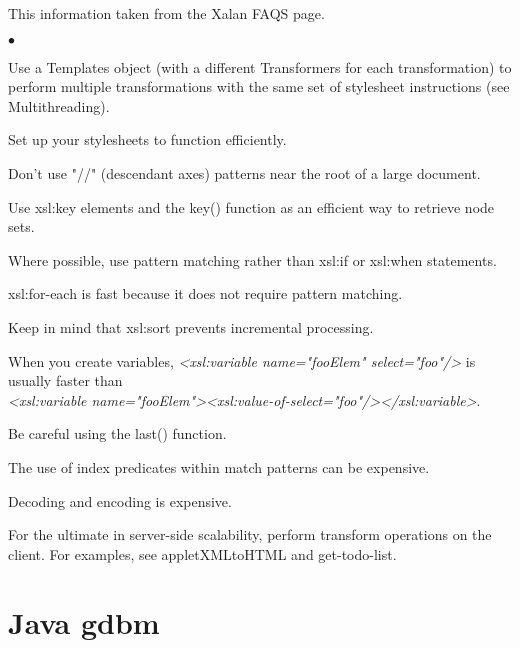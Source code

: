 \documentclass[a4paper,11pt]{article}
\newenvironment{bulletedlist}%
{\begin{list}{$\bullet$}{\setlength{\itemsep}{0pt}\setlength{\parsep}{0pt}}}%
{\end{list}}
\begin{document}
This information taken from the Xalan FAQS page.

\begin{bulletedlist}

\item Use a Templates object (with a different Transformers for each
transformation) to perform multiple transformations with the same set
of stylesheet instructions (see Multithreading).

\item Set up your stylesheets to function efficiently.

\item Don't use "//" (descendant axes) patterns near the root of a
large document.

\item Use xsl:key elements and the key() function as an efficient way
to retrieve node sets.

\item Where possible, use pattern matching rather than xsl:if or
xsl:when statements.

\item xsl:for-each is fast because it does not require pattern matching.

\item Keep in mind that xsl:sort prevents incremental processing.

\item When you create variables,
{\em <xsl:variable name="fooElem" select="foo"/>\/} is usually faster
than \\
{\em <xsl:variable name="fooElem"><xsl:value-of-select="foo"/></xsl:variable>\/}.

\item Be careful using the last() function.

\item The use of index predicates within match patterns can be expensive.

\item Decoding and encoding is expensive.

\item For the ultimate in server-side scalability, perform transform
operations on the client. For examples, see appletXMLtoHTML and
get-todo-list.

\end{bulletedlist}

\section{Java gdbm}
\end{document}
